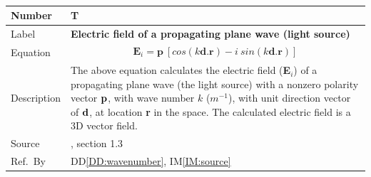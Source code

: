 \documentclass[12pt]{article}
\newcommand{\colBwidth}{0.82\textwidth} \newcommand{\colCwidth}{0.1\textwidth}
\begin{document}
	~\newline \noindent \begin{minipage}{\textwidth}
		\renewcommand*{\arraystretch}{1.5} \begin{tabular}{| p{\colAwidth} |
				p{\colBwidth}|} \hline \rowcolor[gray]{0.9} Number&
			T{theorynum}\thetheorynum \label{TM:source}\\ \hline Label&\bf
			Electric field of a propagating plane wave (light source) \\ \hline Equation&
			\begin{equation} \label{eq:planewave} \begin{gathered} \textbf{E}_{i}=
					\textbf{p}\ [ cos(k\textbf{d.r})- i \ sin(k\textbf{d.r})] \end{gathered} 
			\end{equation} \\
			
			
			\hline Description & The above equation calculates the electric field (\textbf{E}$_i$) of a
			propagating plane wave (the light source) with a nonzero polarity vector $\bf
			p$, with wave number $k$ ($m^{-1}$), with unit direction vector of $\bf d$,
			 at location \textbf{r} in the space. The calculated
			electric field is a 3D vector field. \\ \hline Source &
			
			\cite{monk2003finite}, section 1.3 \\ %
			\hline Ref.\ By & DD\ref{DD:wavenumber}, IM\ref{IM:source} \\ \hline
	\end{tabular} \end{minipage}\\
	
	
\end{document}
